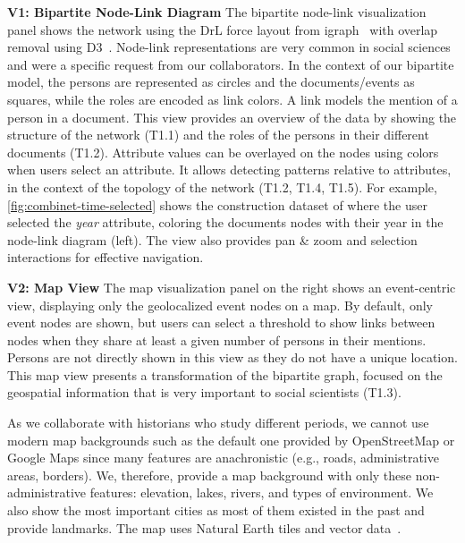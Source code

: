 \noindent\textbf{V1: Bipartite Node-Link Diagram}
The bipartite node-link visualization panel shows the network using the DrL force layout from igraph~\cite{igraph} with overlap removal using D3~\cite{d3}.
Node-link representations are very common in social sciences~\cite{Gephi, mrvarAnalysisVisualizationLarge2016, NodeXL} and were a specific request from our collaborators.
In the context of our bipartite model, the persons are represented as circles and the documents/events as squares, while the roles are encoded as link colors.
A link models the mention of a person in a document.
This view provides an overview of the data by showing the structure of the network (T1.1) and the roles of the persons in their different documents (T1.2).
Attribute values can be overlayed on the nodes using colors when users select an attribute. It allows detecting patterns relative to attributes, in the context of the topology of the network (T1.2, T1.4, T1.5). For example, \autoref{fig:combinet-time-selected} shows the construction dataset of \pascal where the user selected the \textit{year} attribute, coloring the documents nodes with their year in the node-link diagram (left).
The view also provides pan \& zoom and selection interactions for effective navigation.

\noindent\textbf{V2: Map View}
The map visualization panel on the right shows an event-centric view, displaying only the geolocalized event nodes on a map.
By default, only event nodes are shown, but users can select a threshold to show links between nodes when they share at least a given number of persons in their mentions.
Persons are not directly shown in this view as they do not have a unique location.
This map view presents a transformation of the bipartite graph, focused on the geospatial information that is very important to social scientists (T1.3).

As we collaborate with historians who study different periods, we cannot use modern map backgrounds such as the default one provided by OpenStreetMap or Google Maps since many features are anachronistic (e.g., roads, administrative areas, borders). We, therefore, provide a map background with only these non-administrative features: elevation, lakes, rivers, and types of environment.
We also show the most important cities as most of them existed in the past and provide landmarks.
The map uses Natural Earth tiles and vector data~\cite{NaturalEarth}.

